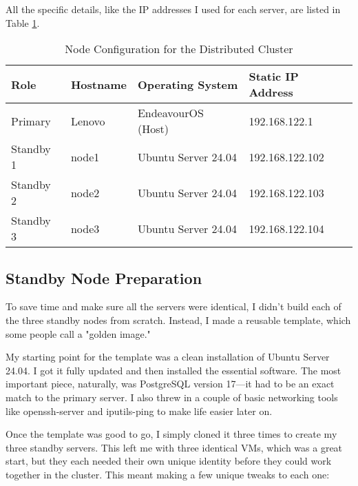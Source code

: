 \documentclass[conference]{IEEEtran}
\begin{document}
All the specific details, like the IP addresses I used for each server, are listed in Table \ref{tab:node_config}.
\begin{table}[h!]
\centering
\caption{Node Configuration for the Distributed Cluster}
\label{tab:node_config}
\begin{tabular}{l l l l}
\toprule
\textbf{Role} & \textbf{Hostname} & \textbf{Operating System} & \textbf{Static IP Address} \\
\midrule
Primary   & Lenovo & EndeavourOS (Host) & 192.168.122.1 \\
Standby 1 & node1             & Ubuntu Server 24.04  & 192.168.122.102 \\
Standby 2 & node2             & Ubuntu Server 24.04  & 192.168.122.103 \\
Standby 3 & node3             & Ubuntu Server 24.04  & 192.168.122.104 \\
\bottomrule
\end{tabular}
\end{table}

\subsection{Standby Node Preparation}
To save time and make sure all the servers were identical, I didn't build each of the three standby nodes from scratch. Instead, I made a reusable template, which some people call a "golden image."

My starting point for the template was a clean installation of Ubuntu Server 24.04. I got it fully updated and then installed the essential software. The most important piece, naturally, was PostgreSQL version 17—it had to be an exact match to the primary server. I also threw in a couple of basic networking tools like openssh-server and iputils-ping to make life easier later on.

Once the template was good to go, I simply cloned it three times to create my three standby servers. This left me with three identical VMs, which was a great start, but they each needed their own unique identity before they could work together in the cluster. This meant making a few unique tweaks to each one:
\end{document}
